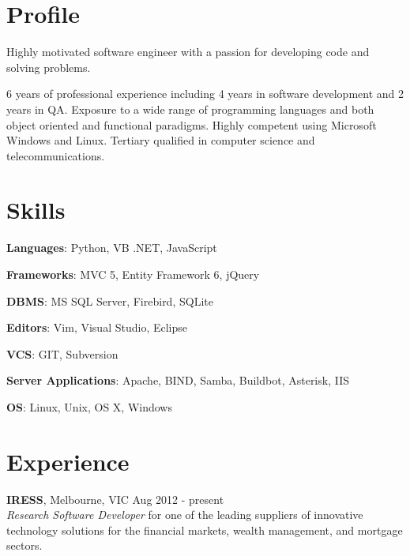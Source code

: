 \documentclass[line,margin]{res}
\begin{document}
    \address{ablack@fastmail.net}
    \address{0401 868 343}

    \begin{resume}
        \section{Profile}
        Highly motivated software engineer with a passion for developing code and solving problems.

        6 years of professional experience including 4 years in software development and 2 years in
        QA. Exposure to a wide range of programming languages and both object oriented and functional
        paradigms. Highly competent using Microsoft Windows and Linux. Tertiary qualified in computer
        science and telecommunications.

        \section{Skills}
        \begin{list}{}{\leftmargin=1em \itemsep=-2pt}
            \item{\textbf{Languages}: Python, VB .NET, JavaScript}
            \item{\textbf{Frameworks}: MVC 5, Entity Framework 6, jQuery}
            \item{\textbf{DBMS}: MS SQL Server, Firebird, SQLite}
            \item{\textbf{Editors}: Vim, Visual Studio, Eclipse}
            \item{\textbf{VCS}: GIT, Subversion}
            \item{\textbf{Server Applications}: Apache, BIND, Samba, Buildbot, Asterisk, IIS}
            \item{\textbf{OS}: Linux, Unix, OS X, Windows}
        \end{list}

        \section{Experience}
        \textbf{IRESS}, Melbourne, VIC \hfill Aug 2012 - present \\
        \textit{Research Software Developer} for one of the leading suppliers of innovative technology
        solutions for the financial markets, wealth management, and mortgage sectors.


\end{resume}
\end{document}
